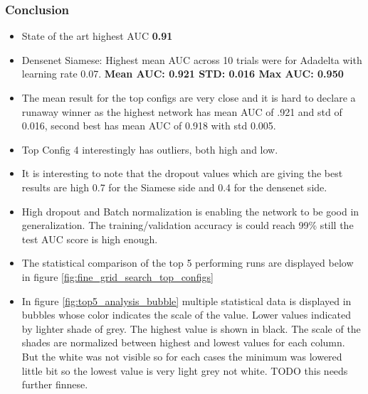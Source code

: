 \subsubsection{Conclusion}
\begin{itemize}
 \item State of the art highest AUC \textbf{0.91}
 \item Densenet Siamese: Highest mean AUC across 10 trials were for Adadelta with learning rate 0.07. \textbf{Mean AUC: 0.921 STD: 0.016 Max AUC: 0.950}
 \item The mean result for the top configs are very close and it is hard to declare a runaway winner as the highest network has mean AUC of .921 and std of 0.016, second best has mean AUC of 0.918 with std 0.005. 
 \item Top Config 4 interestingly has outliers, both high and low. 
 \item It is interesting to note that the dropout values which are giving the best results are high 0.7 for the Siamese side and 0.4 for the densenet side. 
 \item High dropout and Batch normalization is enabling the network to be good in generalization. The training/validation accuracy is could reach 99\% still the test AUC score is high enough.
 \item The statistical comparison of the top 5 performing runs are displayed below in figure \ref{fig:fine_grid_search_top_configs}
 \item In figure \ref{fig:top5_analysis_bubble} multiple statistical data is displayed in bubbles whose color indicates the scale of the value. Lower values indicated by lighter shade of grey. The highest value is shown 
 in black. The scale of the shades are normalized between highest and lowest values for each column. But the white was not visible so for each cases the minimum was lowered little bit so the lowest value is very light grey 
 not white. TODO this needs further finnese. %
\end{itemize}




